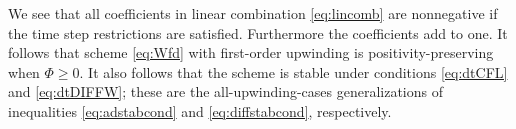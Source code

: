 \documentclass[11pt,final]{amsart}%
\begin{document}
We see that all coefficients in linear combination \eqref{eq:lincomb} are nonnegative if the time step restrictions are satisfied.  Furthermore the coefficients add to one.  It follows \citep{MortonMayers} that scheme \eqref{eq:Wfd} with first-order upwinding is positivity-preserving when $\Phi\ge 0$.  It also follows that the scheme is stable under conditions \eqref{eq:dtCFL} and \eqref{eq:dtDIFFW}; these are the all-upwinding-cases generalizations of inequalities \eqref{eq:adstabcond} and \eqref{eq:diffstabcond}, respectively.
\end{document}
